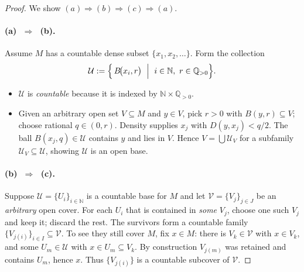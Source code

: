 \documentclass[12pt]{article}
\theoremstyle{definition} %
\theoremstyle{plain} %
\begin{document}
\begin{proof}
  We show $(a)\!\Rightarrow\!(b)\!\Rightarrow\!(c)\!\Rightarrow\!(a)$.

  \paragraph{\textbf{(a) $\;\Longrightarrow\;$ (b).}}
  Assume $M$ has a countable dense subset $\{x_1,x_2,\dots\}$.
  Form the collection
  \[
      \mathcal U
      :=\Bigl\{\,B\!\bigl(x_i,r\bigr)\ \Bigm|\ 
          i\in\mathbb N,\ r\in\mathbb Q_{>0}\Bigr\}.
  \]
  \begin{itemize}
      \item $\mathcal U$ is \emph{countable} because it is indexed by
            $\mathbb N\times\mathbb Q_{>0}$.
      \item Given an arbitrary open set $V\subseteq M$ and $y\in V$,
            pick $r>0$ with $B(y,r)\subseteq V$; choose rational
            $q\in(0,r)$.  
            Density supplies $x_j$ with $D(y,x_j)<q/2$.
            The ball $B(x_j,q)\in\mathcal U$
            contains $y$ and lies in $V$.
            Hence $V=\bigcup\mathcal U_V$ for a subfamily
            $\mathcal U_V\subseteq\mathcal U$,
            showing $\mathcal U$ is an open base.
  \end{itemize}

  \paragraph{\textbf{(b) $\;\Longrightarrow\;$ (c).}}
  Suppose $\mathcal U=\{U_i\}_{i\in\mathbb N}$ is a countable base for $M$
  and let $\mathcal V=\{V_j\}_{j\in J}$ be an \emph{arbitrary} open cover.
  For each $U_i$ that is contained in \emph{some} $V_j$,
  choose one such $V_j$ and keep it; discard the rest.
  The survivors form a countable family
  $\{V_{j(i)}\}_{i\in I}\subseteq\mathcal V$.
  To see they still cover $M$, fix $x\in M$:
  there is $V_k\in\mathcal V$ with $x\in V_k$,
  and some $U_m\in\mathcal U$ with $x\in U_m\subseteq V_k$.
  By construction $V_{j(m)}$ was retained and contains $U_m$, hence $x$.
  Thus $\{V_{j(i)}\}$ is a countable subcover of $\mathcal V$.


\end{proof}
\end{document}
